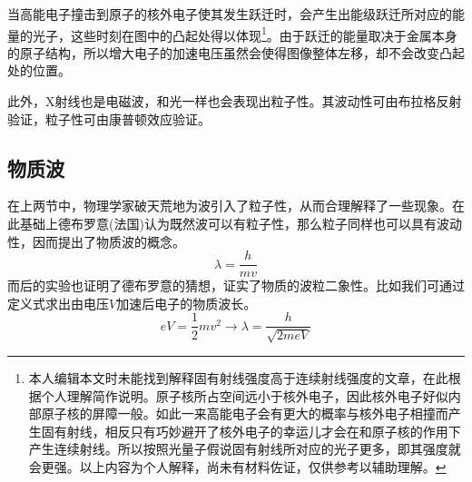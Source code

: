 当高能电子撞击到原子的核外电子使其发生跃迁时，会产生出能级跃迁所对应的能量的光子，这些时刻在图中的凸起处得以体现\footnote{本人编辑本文时未能找到解释固有射线强度高于连续射线强度的文章，在此根据个人理解简作说明。原子核所占空间远小于核外电子，因此核外电子好似内部原子核的屏障一般。如此一来高能电子会有更大的概率与核外电子相撞而产生固有射线，相反只有巧妙避开了核外电子的幸运儿才会在和原子核的作用下产生连续射线。所以按照光量子假说固有射线所对应的光子更多，即其强度就会更强。以上内容为个人解释，尚未有材料佐证，仅供参考以辅助理解。}。由于跃迁的能量取决于金属本身的原子结构，所以增大电子的加速电压虽然会使得图像整体左移，却不会改变凸起处的位置。

此外，X射线也是电磁波，和光一样也会表现出粒子性。其波动性可由布拉格反射验证，粒子性可由康普顿效应验证。

\subsection{物质波}

在上两节中，物理学家破天荒地为波引入了粒子性，从而合理解释了一些现象。在此基础上德布罗意(法国)认为既然波可以有粒子性，那么粒子同样也可以具有波动性，因而提出了物质波的概念。
\begin{equation*}
    \lambda=\frac{h}{mv}
\end{equation*}
而后的实验也证明了德布罗意的猜想，证实了物质的波粒二象性。比如我们可通过定义式求出由电压$V$加速后电子的物质波长。
\begin{equation*}
    eV=\frac12mv^2\to
    \lambda=\frac{h}{\sqrt{2meV}}
\end{equation*}
